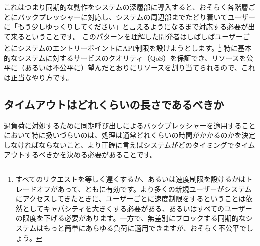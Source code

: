 これはつまり同期的な動作をシステムの深層部に導入すると、おそらく各階層ごとにバックプレッシャーに対応し、システムの周辺部までたどり着いてユーザーに「もう少しゆっくりしてください」と言えるようになるまで対応する必要が出て来るということです。
このパターンを理解した開発者はしばしばユーザーごとにシステムのエントリーポイントにAPI制限を設けようとします。\footnote{すべてのリクエストを等しく遅くするか、あるいは速度制限を設けるかはトレードオフがあって、ともに有効です。より多くの新規ユーザーがシステムにアクセスしてきたときに、ユーザーごとに速度制限をするということは依然としてキャパシティを大きくする必要がある、あるいはすべてのユーザーの限度を下げる必要があります。一方で、無差別にブロックする同期的なシステムはもっと簡単にあらゆる負荷に適用できますが、おそらく不公平でしょう。}
特に基本的なシステムに対するサービスのクオリティ（QoS）を保証でき、リソースを公平に（あるいは不公平に）望んだとおりにリソースを割り当てられるので、これは正当なやり方です。

\subsection{タイムアウトはどれくらいの長さであるべきか}

過負荷に対処するために同期呼び出しによるバックプレッシャーを適用することにおいて特に扱いづらいのは、処理は通常どれくらいの時間がかかるのかを決定しなければならないこと、より正確に言えばシステムがどのタイミングでタイムアウトするべきかを決める必要があることです。


